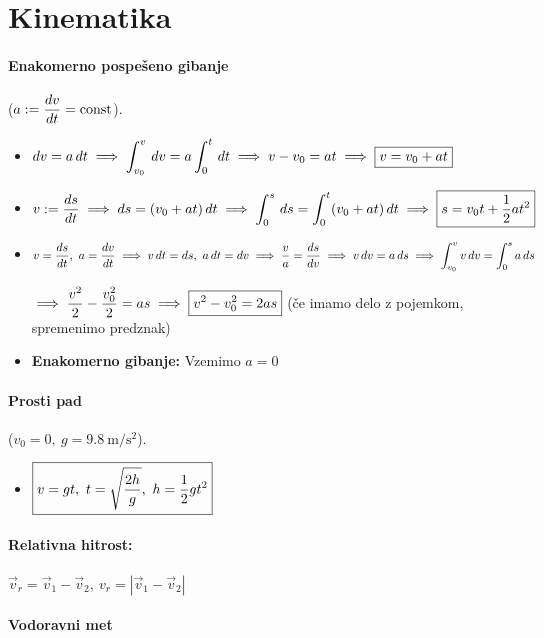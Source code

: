 \section{Kinematika}
\paragraph{Enakomerno pospešeno gibanje} (\(\displaystyle a := \frac{dv}{dt} = \text{const}\)).
%
\begin{itemize}
    \item \(\displaystyle dv = a \, dt \implies \int_{v_0}^{v} \, dv = a \int_{0}^{t} \, dt \implies v - v_0 = at \implies  \boxed{v = v_0 + at}\)
    \item \(\displaystyle v := \frac{ds}{dt} \implies ds = (v_0 + at) \, dt \implies \int_{0}^{s} \, ds = \int_{0}^{t} (v_0 + at) \, dt \implies \boxed{s = v_0t + \frac{1}{2}at^2}\)
    \item \(\displaystyle v = \frac{ds}{dt}, \ a = \frac{dv}{dt} \implies v \, dt = ds, \ a \, dt = dv \implies \frac{v}{a} = \frac{ds}{dv} \implies v \, dv = a \, ds \implies \int_{v_0}^{v} v \, dv = \int_{0}^{s} a \, ds\)
    
    \(\displaystyle \implies \frac{v^2}{2} - \frac{v_0^2}{2} = as \implies \boxed{v^2 - v_0^2 = 2as}\) (če imamo delo z pojemkom, spremenimo predznak)
    \item \textbf{Enakomerno gibanje:} Vzemimo \(a = 0\)
\end{itemize}
%
\paragraph{Prosti pad} (\(v_0 = 0, \  g = 9.8 \  \text{m} / \text{s}^2\)).
\begin{itemize}
    \item \(\displaystyle \boxed{v = gt, \ t = \sqrt{\frac{2h}{g}}, \ h = \frac{1}{2} g t^2}\)
\end{itemize}

\paragraph{Relativna hitrost:} \(\vec{v}_r = \vec{v}_1 - \vec{v}_2, \ v_r = |\vec{v}_1 - \vec{v}_2|\)
%

\paragraph{Vodoravni met}
\ 

